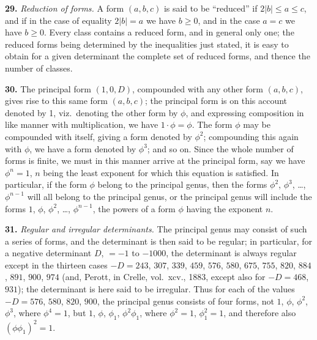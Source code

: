 \documentclass[11pt,a4paper]{book}
\begin{document}
\textbf{29.}\quad
\textit{Reduction of forms.} A form $(a, b, c)$ is said to be ``reduced'' if $2|b| \leq a \leq c$, and if in the case of equality $2|b| = a$ we have $b \geq 0$, and in the case $a = c$ we have $b \geq 0$. Every class contains a reduced form, and in general only one; the reduced forms being determined by the inequalities just stated, it is easy to obtain for a given determinant the complete set of reduced forms, and thence the number of classes.


\textbf{30.}\quad
The principal form $(1, 0, D)$, compounded with any other form $(a, b, c)$, gives rise to this same form $(a, b, c)$; the principal form is on this account denoted by 1, viz.\ denoting the other form by $\phi$, and expressing composition in like manner with multiplication, we have $1 \cdot \phi = \phi$. The form $\phi$ may be compounded with itself, giving a form denoted by $\phi^{2}$; compounding this again with $\phi$, we have a form denoted by $\phi^{3}$; and so on. Since the whole number of forms is finite, we must in this manner arrive at the principal form, say we have $\phi^{n} = 1$, $n$ being the least exponent for which this equation is satisfied. In particular, if the form $\phi$ belong to the principal genus, then the forms $\phi^{2}$, $\phi^{3}$, \ldots, $\phi^{n-1}$ will all belong to the principal genus, or the principal genus will include the forms $1$, $\phi$, $\phi^{2}$, \ldots, $\phi^{n-1}$, the powers of a form $\phi$ having the exponent $n$.

\textbf{31.}\quad
\textit{Regular and irregular determinants.} The principal genus may consist of such a series of forms, and the determinant is then said to be regular; in particular, for a negative determinant $D$, $= -1$ to $-1000$, the determinant is always regular except in the thirteen cases $-D = 243$, $307$, $339$, $459$, $576$, $580$, $675$, $755$, $820$, $884$, $891$, $900$, $974$ (and, Perott, in Crelle, vol.\ xcv., 1883, except also for $-D = 468$, $931$); the determinant is here said to be irregular. Thus for each of the values $-D = 576$, $580$, $820$, $900$, the principal genus consists of four forms, not $1$, $\phi$, $\phi^{2}$, $\phi^{3}$, where $\phi^{4} = 1$, but $1$, $\phi$, $\phi_{1}$, $\phi^{2}\phi_{1}$, where $\phi^{2} = 1$, $\phi_{1}^{2} = 1$, and therefore also $(\phi\phi_{1})^{2} = 1$.
\end{document}
